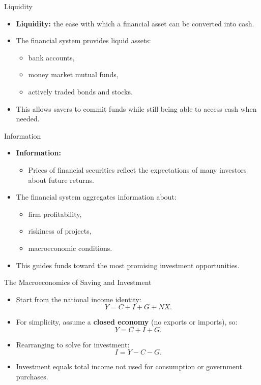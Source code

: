 \documentclass[aspectratio=169]{beamer}
\begin{document}
\begin{frame}{Liquidity}
\transfade
\begin{itemize}
  \item \textbf{Liquidity:} the ease with which a financial asset can be converted into cash.
  \item The financial system provides liquid assets:
  \begin{itemize}
    \item bank accounts,
    \item money market mutual funds,
    \item actively traded bonds and stocks.
  \end{itemize}
  \item This allows savers to commit funds while still being able to access cash when needed.
\end{itemize}
\end{frame}

\begin{frame}{Information}
\transfade
\begin{itemize}
  \item \textbf{Information:}
  \begin{itemize}
    \item Prices of financial securities reflect the expectations of many investors about future returns.
  \end{itemize}
  \item The financial system aggregates information about:
  \begin{itemize}
    \item firm profitability,
    \item riskiness of projects,
    \item macroeconomic conditions.
  \end{itemize}
  \item This guides funds toward the most promising investment opportunities.
\end{itemize}
\end{frame}


\begin{frame}{The Macroeconomics of Saving and Investment}
\transfade
\begin{itemize}
  \item Start from the national income identity:
  \[
    Y = C + I + G + NX.
  \]
  \item For simplicity, assume a \textbf{closed economy} (no exports or imports), so:
  \[
    Y = C + I + G.
  \]
  \item Rearranging to solve for investment:
  \[
    I = Y - C - G.
  \]
  \item Investment equals total income not used for consumption or government purchases.
\end{itemize}
\end{frame}
\end{document}
